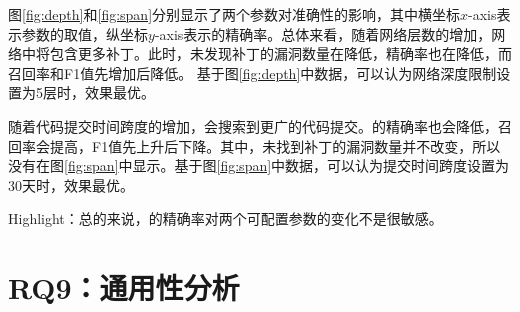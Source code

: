图\ref{fig:depth}和\ref{fig:span}分别显示了两个参数对\tool 准确性的影响，其中横坐标$x$-axis表示参数的取值，纵坐标$y$-axis表示\tool 的精确率。总体来看，随着网络层数的增加，网络中将包含更多补丁。此时，\tool 未发现补丁的漏洞数量在降低，精确率也在降低，而召回率和F1值先增加后降低。
基于图\ref{fig:depth}中数据，可以认为网络深度限制设置为5层时，\tool 效果最优。

随着代码提交时间跨度的增加，\tool 会搜索到更广的代码提交。\tool 的精确率也会降低，召回率会提高，F1值先上升后下降。其中，\tool 未找到补丁的漏洞数量并不改变，所以没有在图\ref{fig:span}中显示。基于图\ref{fig:span}中数据，可以认为提交时间跨度设置为30天时，\tool 效果最优。

\begin{tcolorbox}[size=title,opacityfill=0.15]
Highlight：总的来说，\tool 的精确率对两个可配置参数的变化不是很敏感。
\end{tcolorbox}

\section{RQ9：通用性分析}\label{sec:generality}



